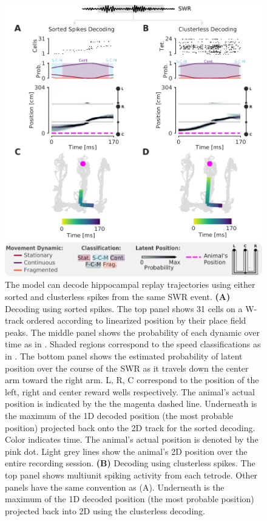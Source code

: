 \documentclass[9pt,lineno]{elife}
\providecommand{\DIFadd}[1]{{\protect\color{blue}\uwave{#1}}} %
\providecommand{\DIFdel}[1]{{\protect\color{red}\sout{#1}}}                      %
\providecommand{\DIFaddFL}[1]{\DIFadd{#1}} %
\providecommand{\DIFdelFL}[1]{\DIFdel{#1}} %
\providecommand{\DIFaddbeginFL}{} %
\providecommand{\DIFaddendFL}{} %
\providecommand{\DIFdelbeginFL}{} %
\providecommand{\DIFdelendFL}{} %
\newcommand{\DIFscaledelfig}{0.5}
\newlength{\DIFdelgraphicswidth} %
\newlength{\DIFdelgraphicsheight} %
\newcommand{\DIFaddincludegraphics}[2][]{{\color{blue}\fbox{\DIFOincludegraphics[#1]{#2}}}} %
\newcommand{\DIFdelincludegraphics}[2][]{%
\sbox{\DIFdelgraphicsbox}{\DIFOincludegraphics[#1]{#2}}%
\settoboxwidth{\DIFdelgraphicswidth}{\DIFdelgraphicsbox} %
\settoboxtotalheight{\DIFdelgraphicsheight}{\DIFdelgraphicsbox} %
\scalebox{\DIFscaledelfig}{%
\parbox[b]{\DIFdelgraphicswidth}{\usebox{\DIFdelgraphicsbox}\\[-\baselineskip] \rule{\DIFdelgraphicswidth}{0em}}\llap{\resizebox{\DIFdelgraphicswidth}{\DIFdelgraphicsheight}{%
\setlength{\unitlength}{\DIFdelgraphicswidth}%
\begin{picture}(1,1)%
\thicklines\linethickness{2pt} %
{\color[rgb]{1,0,0}\put(0,0){\framebox(1,1){}}}%
{\color[rgb]{1,0,0}\put(0,0){\line( 1,1){1}}}%
{\color[rgb]{1,0,0}\put(0,1){\line(1,-1){1}}}%
\end{picture}%
}\hspace*{3pt}}} %
} %
\DeclareRobustCommand{\DIFaddbeginFL}{\DIFOaddbeginFL \let\includegraphics\DIFaddincludegraphics} %
\DeclareRobustCommand{\DIFaddendFL}{\DIFOaddendFL \let\includegraphics\DIFOincludegraphics} %
\DeclareRobustCommand{\DIFdelbeginFL}{\DIFOdelbeginFL \let\includegraphics\DIFdelincludegraphics} %
\DeclareRobustCommand{\DIFdelendFL}{\DIFOaddendFL \let\includegraphics\DIFOincludegraphics} %
\begin{document}
\begin{figure}
\DIFdelbeginFL %
\DIFdelendFL \DIFaddbeginFL \includegraphics[width=0.8\linewidth]{figures/Figure2/Figure2_final}
\DIFaddendFL \caption{The model can decode hippocampal replay trajectories using either sorted and clusterless spikes from the same SWR event. \textbf{(A)} Decoding using sorted spikes. The top panel shows 31 cells on a W-track ordered according to linearized position by their place field peaks. The middle panel shows the probability of each dynamic over time as in \FIG{1}\DIFdelbeginFL \DIFdelFL{F}\DIFdelendFL \DIFaddbeginFL \DIFaddFL{E, left panel}\DIFaddendFL . Shaded regions correspond to the speed classifications as in \FIG{1}\DIFdelbeginFL \DIFdelFL{G}\DIFdelendFL \DIFaddbeginFL \DIFaddFL{F}\DIFaddendFL . The bottom panel shows the estimated probability of latent position over the course of the SWR as it travels down the center arm toward the right arm. L, R, C correspond to the position of the left, right and center reward wells respectively. The animal's actual position is indicated by the the magenta dashed line. Underneath is the maximum of the 1D decoded position (the most probable position) projected back onto the 2D track for the sorted decoding. Color indicates time. The animal's actual position is denoted by the pink dot. Light grey lines show the animal's 2D position over the entire recording session. \textbf{(B)} Decoding using clusterless spikes. The top panel shows multiunit spiking activity from each tetrode. Other panels have the same convention as (A). Underneath is the maximum of the 1D decoded position (the most probable position) projected back into 2D using the clusterless decoding.
}
\label{fig:2}


\end{figure}
\end{document}
